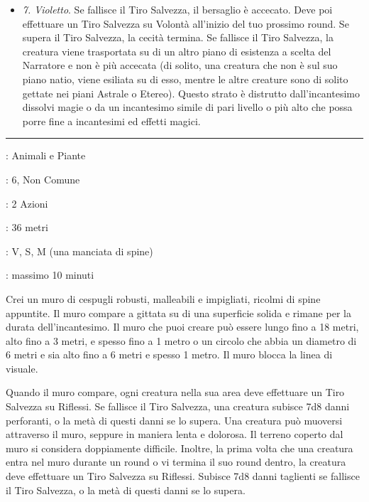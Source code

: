 \begin{multicols}{2}
\begin{itemize}[leftmargin=*]
	\item \emph{7. Violetto}. Se fallisce il Tiro Salvezza, il bersaglio è accecato. Deve poi effettuare un Tiro Salvezza su Volontà all'inizio del tuo prossimo round. Se supera il Tiro Salvezza, la cecità termina. Se fallisce il Tiro Salvezza, la creatura viene trasportata su di un altro piano di esistenza a scelta del Narratore e non è più accecata (di solito, una creatura che non è sul suo piano natio, viene esiliata su di esso, mentre le altre creature sono di solito gettate nei piani Astrale o Etereo). Questo strato è distrutto dall'incantesimo dissolvi magie o da un incantesimo simile di pari livello o più alto che possa porre fine a incantesimi ed effetti magici.

\end{itemize}

\smallskip\noindent\rule{\linewidth}{2pt} \hypertarget{Muro di Spine}{}\smallskip{}
\noindent
\begin{description}[noitemsep, topsep=0pt, parsep=0pt, partopsep=0pt, leftmargin=0cm, labelwidth=2.8cm]
	\item[\textbf{Lista di Magia}]: Animali e Piante
	\item[\textbf{Livello}]: 6, Non Comune
	\item[\textbf{T. di Lancio}]: 2 Azioni
	\item[\textbf{Gittata}]: 36 metri
	\item[\textbf{Componenti}]: V, S, M (una manciata di spine)
	\item[\textbf{Durata}]: massimo 10 minuti
\end{description}

Crei un muro di cespugli robusti, malleabili e impigliati, ricolmi di spine appuntite. Il muro compare a gittata su di una superficie solida e rimane per la durata dell'incantesimo. Il muro che puoi creare può essere lungo fino a 18 metri, alto fino a 3 metri, e spesso fino a 1 metro o un circolo che abbia un diametro di 6 metri e sia alto fino a 6 metri e spesso 1 metro. Il muro blocca la linea di visuale.

Quando il muro compare, ogni creatura nella sua area deve effettuare un Tiro Salvezza su Riflessi. Se fallisce il Tiro Salvezza, una creatura subisce 7d8 danni perforanti, o la metà di questi danni se lo supera. Una creatura può muoversi attraverso il muro, seppure in maniera lenta e dolorosa. Il terreno coperto dal muro si considera doppiamente difficile. Inoltre, la prima volta che una creatura entra nel muro durante un round o vi termina il suo round dentro, la creatura deve effettuare un Tiro Salvezza su Riflessi. Subisce 7d8 danni taglienti se fallisce il Tiro Salvezza, o la metà di questi danni se lo supera.


\end{multicols}
